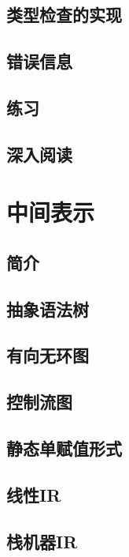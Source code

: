 \documentclass[cn,11pt,chinese]{elegantbook}
\begin{document}
\section{类型检查的实现}

\section{错误信息}

\section{练习}

\section{深入阅读}

\chapter{中间表示}

\section{简介}

\section{抽象语法树}

\section{有向无环图}

\section{控制流图}

\section{静态单赋值形式}

\section{线性IR}

\section{栈机器IR}
\end{document}
